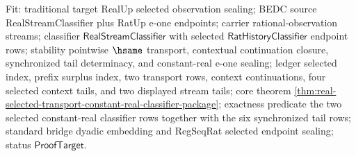 Fit: traditional target RealUp selected observation sealing; BEDC source
RealStreamClassifier plus RatUp e-one endpoints; carrier rational-observation
streams; classifier $\mathsf{RealStreamClassifier}$ with selected
$\mathsf{RatHistoryClassifier}$ endpoint rows; stability pointwise $\hsame$
transport, contextual continuation closure, synchronized tail determinacy, and
constant-real e-one sealing; ledger selected index, prefix surplus index, two
transport rows, context continuations, four selected context tails, and two
displayed stream tails; core theorem
\autoref{thm:real-selected-transport-constant-real-classifier-package};
exactness predicate the two selected constant-real classifier rows together
with the six synchronized tail rows; standard bridge dyadic embedding and
RegSeqRat selected endpoint sealing; status $\mathsf{ProofTarget}$.
